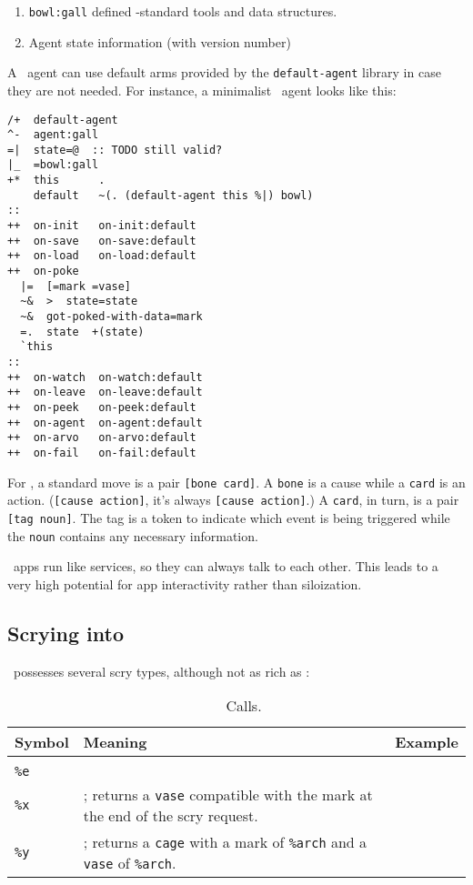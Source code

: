 \begin{enumerate}
  \item  \texttt{bowl:gall} defined \gall-standard tools and data structures.
  \item  Agent state information (with version number)
\end{enumerate}

A \gall~agent can use default arms provided by the \texttt{default-agent} library in case they are not needed.  For instance, a minimalist \gall~agent looks like this:

\begin{lstlisting}
/+  default-agent
^-  agent:gall
=|  state=@  :: TODO still valid?
|_  =bowl:gall
+*  this      .
    default   ~(. (default-agent this %|) bowl)
::
++  on-init   on-init:default
++  on-save   on-save:default
++  on-load   on-load:default
++  on-poke
  |=  [=mark =vase]
  ~&  >  state=state
  ~&  got-poked-with-data=mark
  =.  state  +(state)
  `this
::
++  on-watch  on-watch:default
++  on-leave  on-leave:default
++  on-peek   on-peek:default
++  on-agent  on-agent:default
++  on-arvo   on-arvo:default
++  on-fail   on-fail:default
\end{lstlisting}



For \gall, a standard move is a pair \texttt{[bone card]}.  A \texttt{bone} is a cause while a \texttt{card} is an action.  (\texttt{[cause action]}, it's always \texttt{[cause action]}.)  A \texttt{card}, in turn, is a pair \texttt{[tag noun]}.  The tag is a \pattas token to indicate which event is being triggered while the \texttt{noun} contains any necessary information.

\gall~apps run like services, so they can always talk to each other.  This leads to a very high potential for app interactivity rather than siloization.

\subsection{Scrying into \gall}


\gall~possesses several scry types, although not as rich as \clay:

\begin{table}
  \begin{center}
    \caption{\gall~\dotket~Calls.}
    \label{ha:gall}
    \begin{tabular}{lll}
      Symbol & Meaning & Example \\
      \hline \\
      \texttt{\%e} &  & \\
      \texttt{\%x} & ; returns a \texttt{vase} compatible with the mark at the end of the scry request. & \\
      \texttt{\%y} & ; returns a \texttt{cage} with a mark of \texttt{\%arch} and a \texttt{vase} of \texttt{\%arch}. & \\
    \end{tabular}
  \end{center}
\end{table}


